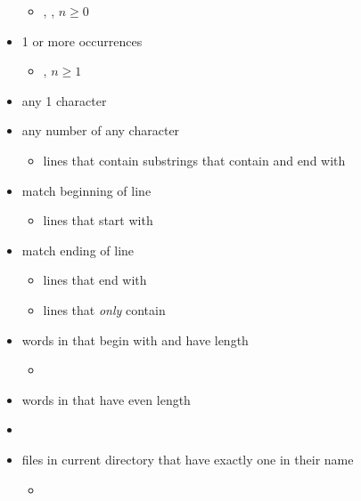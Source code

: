 \begin{itemize}
\begin{itemize}
              \item {} \textrightarrow{} ,
                    , $ n\ge 0 $
          \end{itemize}
    \item \code{+} \textrightarrow{} 1 or more occurrences
          \begin{itemize}
              \item {} \textrightarrow{}
                    , $ n\ge 1 $
          \end{itemize}
    \item {} \textrightarrow{} any 1 character
    \item {} \textrightarrow{} any number of any character
          \begin{itemize}
              \item {} \textrightarrow{} lines that contain substrings
                    that contain  and end with 
          \end{itemize}
    \item \code{\textasciicircum} \textrightarrow{} match beginning of line
          \begin{itemize}
              \item {} lines that start with 
          \end{itemize}
    \item \code{\$} \textrightarrow{} match ending of line
          \begin{itemize}
              \item {} \textrightarrow{} lines that end with 
              \item {}
                    \textrightarrow{} lines that \emph{only} contain
          \end{itemize}
    \item words in  that begin with  and have length 
          \begin{itemize}
              \item {}

          \end{itemize}
    \item words in  that have even length
    \item {}
    \item files in current directory that have exactly one  in their
          name
          \begin{itemize}
              \item {}
          \end{itemize}
\end{itemize}

